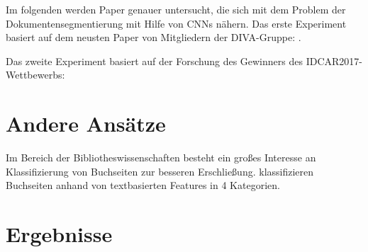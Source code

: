 



Im folgenden werden Paper genauer untersucht, die sich mit dem Problem der Dokumentensegmentierung mit Hilfe von CNNs nähern.
Das erste Experiment basiert auf dem neusten Paper von Mitgliedern der DIVA-Gruppe: \citeauthor*{ChenConvolutionalNeuralNetworks2017}. 

Das zweite Experiment basiert auf der Forschung des Gewinners des IDCAR2017-Wettbewerbs: \citeauthor*{XuPageSegmentationHistorical2017} 

\section{Andere Ansätze}
\cite{WickFullyConvolutionalNeural2017}
Im Bereich der Bibliotheswissenschaften besteht ein großes Interesse an Klassifizierung von
Buchseiten zur besseren Erschließung.
\cite{McConnaugheyLabeledSegmentationPrinted2017} klassifizieren Buchseiten anhand von textbasierten Features in 4 Kategorien. 






\section{Ergebnisse}